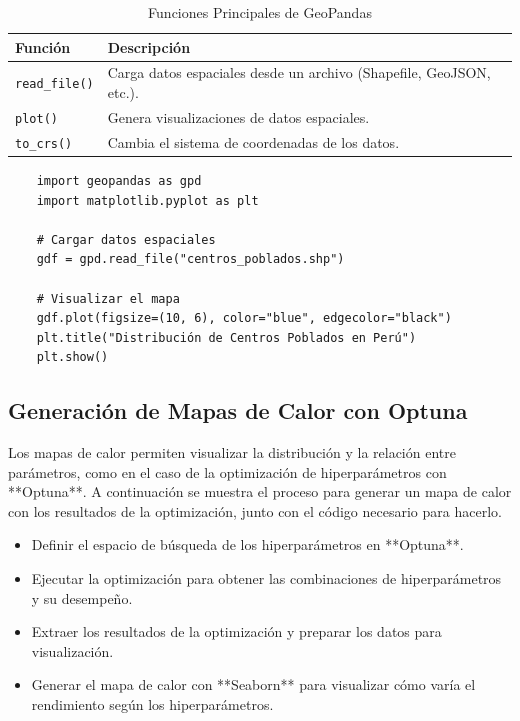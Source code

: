 \documentclass{article}
\begin{document}
{\begin{table}[ht]
	\centering
	\caption{Funciones Principales de GeoPandas}
	\begin{tabularx}{\textwidth}{|l|X|}
		\hline
		\textbf{Función} & \textbf{Descripción} \\
		\hline
		\texttt{read\_file()} & Carga datos espaciales desde un archivo (Shapefile, GeoJSON, etc.). \\
		\hline
		\texttt{plot()} & Genera visualizaciones de datos espaciales. \\
		\hline
		\texttt{to\_crs()} & Cambia el sistema de coordenadas de los datos. \\
		\hline
	\end{tabularx}
	\label{tab:geopandas_funciones}
\end{table}
\begin{verbatim}
	import geopandas as gpd
	import matplotlib.pyplot as plt
	
	# Cargar datos espaciales
	gdf = gpd.read_file("centros_poblados.shp")
	
	# Visualizar el mapa
	gdf.plot(figsize=(10, 6), color="blue", edgecolor="black")
	plt.title("Distribución de Centros Poblados en Perú")
	plt.show()
\end{verbatim}

\subsection*{Generación de Mapas de Calor con Optuna}

Los mapas de calor permiten visualizar la distribución y la relación entre parámetros, como en el caso de la optimización de hiperparámetros con **Optuna**. A continuación se muestra el proceso para generar un mapa de calor con los resultados de la optimización, junto con el código necesario para hacerlo.

\begin{itemize}
	\item Definir el espacio de búsqueda de los hiperparámetros en **Optuna**.
	\item Ejecutar la optimización para obtener las combinaciones de hiperparámetros y su desempeño.
	\item Extraer los resultados de la optimización y preparar los datos para visualización.
	\item Generar el mapa de calor con **Seaborn** para visualizar cómo varía el rendimiento según los hiperparámetros.
\end{itemize}

}
\end{document}
